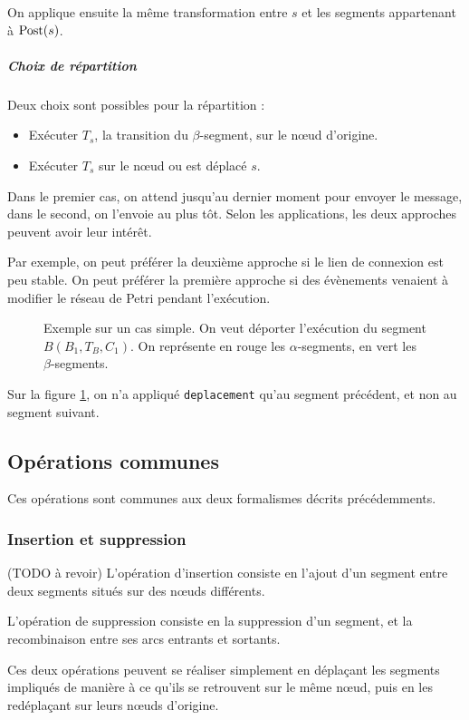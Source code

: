On applique ensuite la même transformation entre $s$ et les segments appartenant à $\operatorname{Post}(s)$.

\subparagraph{Choix de répartition}
Deux choix sont possibles pour la répartition : 

\begin{itemize}
\item Exécuter $T_s$, la transition du $\beta$-segment, sur le nœud d'origine.
\item Exécuter $T_s$ sur le nœud ou est déplacé $s$.
\end{itemize}

Dans le premier cas, on attend jusqu'au dernier moment pour envoyer le message, dans le second, on l'envoie au plus tôt. Selon les applications, les deux approches peuvent avoir leur intérêt.

Par exemple, on peut préférer la deuxième approche si le lien de connexion est peu stable. On peut préférer la première approche si des évènements venaient à modifier le réseau de Petri pendant l'exécution.


\begin{figure}[h]
\centering

\caption{Exemple sur un cas simple. On veut déporter l'exécution du segment $B(B_1, T_B, C_1)$. On représente en rouge les $\alpha$-segments, en vert les $\beta$-segments.}
\label{fig:deplacementForm2}
\end{figure}

Sur la figure \ref{fig:deplacementForm2}, on n'a appliqué \texttt{deplacement} qu'au segment précédent, et non au segment suivant.

\subsection{Opérations communes}
Ces opérations sont communes aux deux formalismes décrits précédemments.

\subsubsection{Insertion et suppression}
(TODO à revoir)
L'opération d'insertion consiste en l'ajout d'un segment entre deux segments situés sur des nœuds différents.

L'opération de suppression consiste en la suppression d'un segment, et la recombinaison entre ses arcs entrants et sortants.

Ces deux opérations peuvent se réaliser simplement en déplaçant les segments impliqués de manière à ce qu'ils se retrouvent sur le même nœud, puis en les redéplaçant sur leurs nœuds d'origine.

